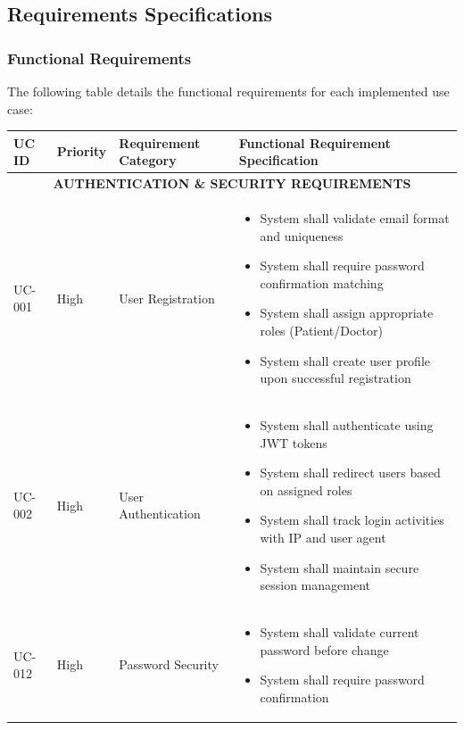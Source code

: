 \documentclass[12pt,a4paper]{article}
\begin{document}
\subsection{Requirements Specifications}

\subsubsection{Functional Requirements}

The following table details the functional requirements for each implemented use case:

\begin{longtable}{|p{1.2cm}|p{2.5cm}|p{3.5cm}|p{6.8cm}|}
\hline
\textbf{UC ID} & \textbf{Priority} & \textbf{Requirement Category} & \textbf{Functional Requirement Specification} \\
\hline
\multicolumn{4}{|c|}{\textbf{AUTHENTICATION \& SECURITY REQUIREMENTS}} \\
\hline
UC-001 & High & User Registration & 
\begin{itemize}[leftmargin=*,topsep=1pt,partopsep=0pt,parsep=0pt,itemsep=1pt]
\item System shall validate email format and uniqueness
\item System shall require password confirmation matching
\item System shall assign appropriate roles (Patient/Doctor)
\item System shall create user profile upon successful registration
\end{itemize} \\
\hline
UC-002 & High & User Authentication & 
\begin{itemize}[leftmargin=*,topsep=1pt,partopsep=0pt,parsep=0pt,itemsep=1pt]
\item System shall authenticate using JWT tokens
\item System shall redirect users based on assigned roles
\item System shall track login activities with IP and user agent
\item System shall maintain secure session management
\end{itemize} \\
\hline
UC-012 & High & Password Security & 
\begin{itemize}[leftmargin=*,topsep=1pt,partopsep=0pt,parsep=0pt,itemsep=1pt]
\item System shall validate current password before change
\item System shall require password confirmation

\end{itemize}
\end{longtable}
\end{document}
